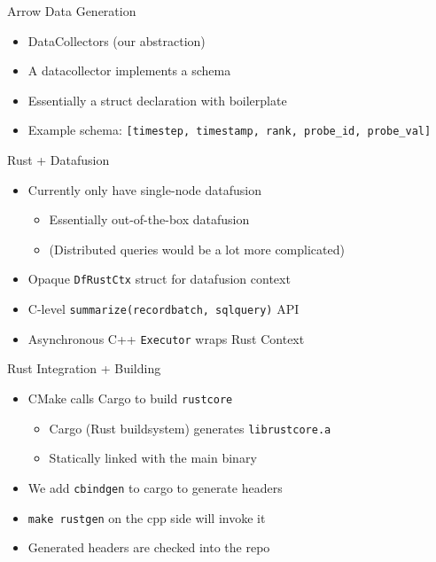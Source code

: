 \documentclass[]{beamer}
\begin{document}
\begin{frame}[fragile]{Arrow Data Generation}
  \begin{itemize}
    \item DataCollectors (our abstraction)
    \item A datacollector implements a schema
    \item Essentially a struct declaration with boilerplate
    \item Example schema: \verb|[timestep, timestamp, rank, probe_id, probe_val]|
  \end{itemize}
\end{frame}

\begin{frame}[fragile]{Rust + Datafusion}
  \begin{itemize}
    \item Currently only have single-node datafusion
    \begin{itemize}
      \item Essentially out-of-the-box datafusion
      \item (Distributed queries would be a lot more complicated)
    \end{itemize}
    \pause
    \item Opaque \verb|DfRustCtx| struct for datafusion context
    \pause
    \item C-level \verb|summarize(recordbatch, sqlquery)| API
    \pause
    \item Asynchronous C++ \verb|Executor| wraps Rust Context
  \end{itemize}
\end{frame}

\begin{frame}[fragile]{Rust Integration + Building}
  \begin{itemize}
    \item CMake calls Cargo to build \verb|rustcore|
    \begin{itemize}
      \item Cargo (Rust buildsystem) generates \verb|librustcore.a|
      \item Statically linked with the main binary
    \end{itemize}
    \pause
  \item We add \verb|cbindgen| to cargo to generate headers
  \item \verb|make rustgen| on the cpp side will invoke it
    \pause
  \item Generated headers are checked into the repo
  \end{itemize}
\end{frame}
\end{document}

